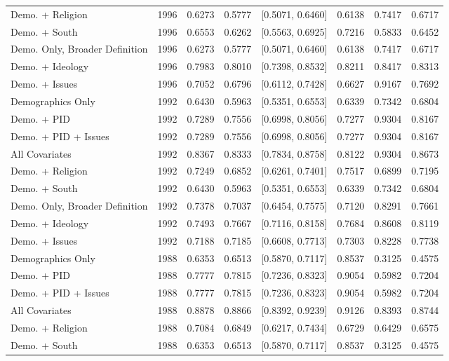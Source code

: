 \begin{longtable}{lrrrlrrr}
  Demo. + Religion & 1996 & 0.6273 & 0.5777 & [0.5071, 0.6460] & 0.6138 & 0.7417 & 0.6717 \\ 
  Demo. + South & 1996 & 0.6553 & 0.6262 & [0.5563, 0.6925] & 0.7216 & 0.5833 & 0.6452 \\ 
  Demo. Only, Broader Definition & 1996 & 0.6273 & 0.5777 & [0.5071, 0.6460] & 0.6138 & 0.7417 & 0.6717 \\ 
  Demo. + Ideology & 1996 & 0.7983 & 0.8010 & [0.7398, 0.8532] & 0.8211 & 0.8417 & 0.8313 \\ 
  Demo. + Issues & 1996 & 0.7052 & 0.6796 & [0.6112, 0.7428] & 0.6627 & 0.9167 & 0.7692 \\ 
  Demographics Only & 1992 & 0.6430 & 0.5963 & [0.5351, 0.6553] & 0.6339 & 0.7342 & 0.6804 \\ 
  Demo. + PID & 1992 & 0.7289 & 0.7556 & [0.6998, 0.8056] & 0.7277 & 0.9304 & 0.8167 \\ 
  Demo. + PID + Issues & 1992 & 0.7289 & 0.7556 & [0.6998, 0.8056] & 0.7277 & 0.9304 & 0.8167 \\ 
  All Covariates & 1992 & 0.8367 & 0.8333 & [0.7834, 0.8758] & 0.8122 & 0.9304 & 0.8673 \\ 
  Demo. + Religion & 1992 & 0.7249 & 0.6852 & [0.6261, 0.7401] & 0.7517 & 0.6899 & 0.7195 \\ 
  Demo. + South & 1992 & 0.6430 & 0.5963 & [0.5351, 0.6553] & 0.6339 & 0.7342 & 0.6804 \\ 
  Demo. Only, Broader Definition & 1992 & 0.7378 & 0.7037 & [0.6454, 0.7575] & 0.7120 & 0.8291 & 0.7661 \\ 
  Demo. + Ideology & 1992 & 0.7493 & 0.7667 & [0.7116, 0.8158] & 0.7684 & 0.8608 & 0.8119 \\ 
  Demo. + Issues & 1992 & 0.7188 & 0.7185 & [0.6608, 0.7713] & 0.7303 & 0.8228 & 0.7738 \\ 
  Demographics Only & 1988 & 0.6353 & 0.6513 & [0.5870, 0.7117] & 0.8537 & 0.3125 & 0.4575 \\ 
  Demo. + PID & 1988 & 0.7777 & 0.7815 & [0.7236, 0.8323] & 0.9054 & 0.5982 & 0.7204 \\ 
  Demo. + PID + Issues & 1988 & 0.7777 & 0.7815 & [0.7236, 0.8323] & 0.9054 & 0.5982 & 0.7204 \\ 
  All Covariates & 1988 & 0.8878 & 0.8866 & [0.8392, 0.9239] & 0.9126 & 0.8393 & 0.8744 \\ 
  Demo. + Religion & 1988 & 0.7084 & 0.6849 & [0.6217, 0.7434] & 0.6729 & 0.6429 & 0.6575 \\ 
  Demo. + South & 1988 & 0.6353 & 0.6513 & [0.5870, 0.7117] & 0.8537 & 0.3125 & 0.4575 \\ 

\end{longtable}

